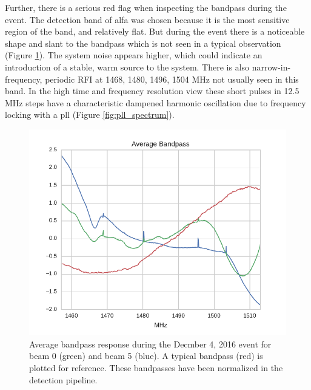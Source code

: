 \documentclass[a4paper,fleqn,usenatbib]{mnras}
\begin{document}
Further, there is a serious red flag when inspecting the bandpass during the
event. The detection band of \gls{alfa} was chosen because it is the most
sensitive region of the band, and relatively flat. But during the event there is
a noticeable shape and slant to the bandpass which is not seen in a typical
observation (Figure \ref{fig:bandpass_response}). The system noise appears
higher, which could indicate an introduction of a stable, warm source to the
system. There is also narrow-in-frequency, periodic RFI at 1468, 1480, 1496,
1504 MHz not usually seen in this band. In the high time and frequency
resolution view these short pulses in 12.5 MHz steps have a characteristic
dampened harmonic oscillation due to frequency locking with a \gls{pll} (Figure
\ref{fig:pll_spectrum}).
%
\begin{figure}
    \includegraphics[width=1.0\linewidth]{figures/bandpass_response.pdf}
    \caption{Average bandpass response during the Decmber 4, 2016 event for beam
    0 (green) and beam 5 (blue). A typical bandpass (red) is plotted for
    reference. These bandpasses have been normalized in the detection pipeline.
    }
    \label{fig:bandpass_response}
\end{figure}
%
\end{document}
